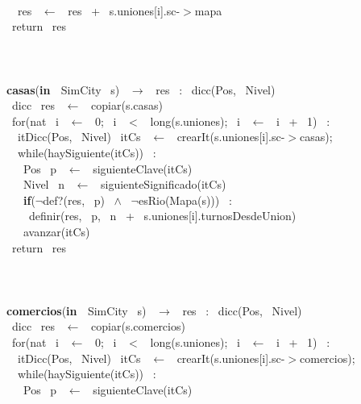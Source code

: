 \\\indent \ \indent \ res \ $\leftarrow$ \ res \ + \ s.uniones[i].sc-$>$mapa
\\\indent \ return \ res
\\\noindent\makebox[\linewidth]{\rule{\textwidth}{0.4pt}}
\\
\\\noindent\makebox[\linewidth]{\rule{\textwidth}{0.4pt}}
\\\textbf{casas}(\textbf{in \ }SimCity \ s) \ $\rightarrow $ \ res \ : \ dicc(Pos, \ Nivel)
\\\indent \ dicc \ res \ $\leftarrow$ \ copiar(s.casas)
\\\indent \ for(nat \ i \ $\leftarrow$ \ 0; \ i \ $<$ \ long(s.uniones); \ i \ $\leftarrow$ \ i \ + \ 1) \ : \ 
\\\indent \ \indent \ itDicc(Pos, \ Nivel) \ itCs \ $\leftarrow$ \ crearIt(s.uniones[i].sc-$>$casas);
\\\indent \ \indent \ while(haySiguiente(itCs)) \ :
\\\indent \ \indent \ \indent \ Pos \ p \ $\leftarrow$ \ siguienteClave(itCs)
\\\indent \ \indent \ \indent \ Nivel \ n \ $\leftarrow$ \ siguienteSignificado(itCs)
\\\indent \ \indent \ \indent \ \textbf{if}($\neg$def?(res, \ p) \ $\wedge$ \ $\neg$esRio(Mapa(s))) \ :
\\\indent \ \indent \ \indent \ \indent \ definir(res, \ p, \ n \ + \ s.uniones[i].turnosDesdeUnion)
\\\indent \ \indent \ \indent \ avanzar(itCs)
\\\indent \ return \ res
\\\noindent\makebox[\linewidth]{\rule{\textwidth}{0.4pt}}
\\
\\\noindent\makebox[\linewidth]{\rule{\textwidth}{0.4pt}}
\\\textbf{comercios}(\textbf{in \ }SimCity \ s) \ $\rightarrow $ \ res \ : \ dicc(Pos, \ Nivel)
\\\indent \ dicc \ res \ $\leftarrow$ \ copiar(s.comercios)
\\\indent \ for(nat \ i \ $\leftarrow$ \ 0; \ i \ $<$ \ long(s.uniones); \ i \ $\leftarrow$ \ i \ + \ 1) \ : \ 
\\\indent \ \indent \ itDicc(Pos, \ Nivel) \ itCs \ $\leftarrow$ \ crearIt(s.uniones[i].sc-$>$comercios);
\\\indent \ \indent \ while(haySiguiente(itCs)) \ :
\\\indent \ \indent \ \indent \ Pos \ p \ $\leftarrow$ \ siguienteClave(itCs)
